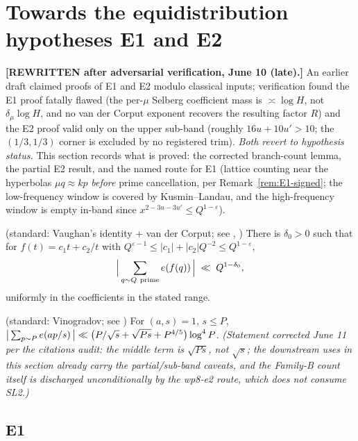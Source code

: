 \section{Towards the equidistribution hypotheses E1 and E2}\label{sec:e1e2}

\textbf{[REWRITTEN after adversarial verification, June 10 (late).]}
An earlier draft claimed proofs of E1 and E2 modulo classical inputs;
verification found the E1 proof fatally flawed (the per-$\mu$ Selberg
coefficient mass is $\asymp\log H$, not $\delta_\mu\log H$, and no
van der Corput exponent recovers the resulting factor $R$) and the E2
proof valid only on the upper sub-band (roughly $16u+10u'>10$; the
$(1/3,1/3)$ corner is excluded by no registered trim). \emph{Both
revert to hypothesis status.} This section records what is proved:
the corrected branch-count lemma, the partial E2 result, and the named
route for E1 (lattice counting near the hyperbolas $\mu q\approx kp$
\emph{before} prime cancellation, per Remark~\ref{rem:E1-signed}; the
low-frequency window is covered by Kusmin--Landau, and the
high-frequency window is empty in-band since
$x^{2-3u-3u'}\le Q^{1-\varepsilon}$).

\begin{lemma}\label{lem:SL1}
\statusN{} (standard: Vaughan's identity + van der Corput; see
\cite[Ch.~13]{IK04}, \cite{Vau97})\quad
There is $\delta_0>0$ such that for $f(t)=c_1t+c_2/t$ with
$Q^{\varepsilon-1}\le|c_1|+|c_2|Q^{-2}\le Q^{1-\varepsilon}$,
\[
\Big|\sum_{q\sim Q\ \mathrm{prime}}\e{f(q)}\Big|\;\ll\;Q^{1-\delta_0},
\]
uniformly in the coefficients in the stated range.
\end{lemma}

\begin{lemma}\label{lem:SL2}
\statusN{} (standard: Vinogradov; see \cite[Ch.~13]{IK04})\quad
For $(a,s)=1$, $s\le P$,
$\big|\sum_{p\sim P}e\!\left(ap/s\right)\big|
\ll\big(P/\sqrt s+\sqrt{Ps}+P^{4/5}\big)\log^{4}P$.
\emph{(Statement corrected June 11 per the citations audit: the middle
term is $\sqrt{Ps}$, not $\sqrt s$; the downstream uses in this
section already carry the partial/sub-band caveats, and the Family-B
count itself is discharged unconditionally by the wp8-e2 route, which
does not consume SL2.)}
\end{lemma}

\subsection{E1}

